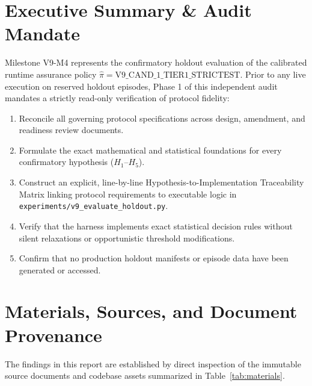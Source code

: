 \documentclass[10pt,a4paper]{article}
\begin{document}
\section{Executive Summary \& Audit Mandate}
Milestone V9-M4 represents the confirmatory holdout evaluation of the calibrated runtime assurance policy $\hat{\pi} = \text{V9\_CAND\_1\_TIER1\_STRICTEST}$. Prior to any live execution on reserved holdout episodes, Phase 1 of this independent audit mandates a strictly read-only verification of protocol fidelity:
\begin{enumerate}
    \item Reconcile all governing protocol specifications across design, amendment, and readiness review documents.
    \item Formulate the exact mathematical and statistical foundations for every confirmatory hypothesis ($H_1$–$H_5$).
    \item Construct an explicit, line-by-line Hypothesis-to-Implementation Traceability Matrix linking protocol requirements to executable logic in \texttt{experiments/v9\_evaluate\_holdout.py}.
    \item Verify that the harness implements exact statistical decision rules without silent relaxations or opportunistic threshold modifications.
    \item Confirm that no production holdout manifests or episode data have been generated or accessed.
\end{enumerate}

\section{Materials, Sources, and Document Provenance}
The findings in this report are established by direct inspection of the immutable source documents and codebase assets summarized in Table~\ref{tab:materials}.
\end{document}
